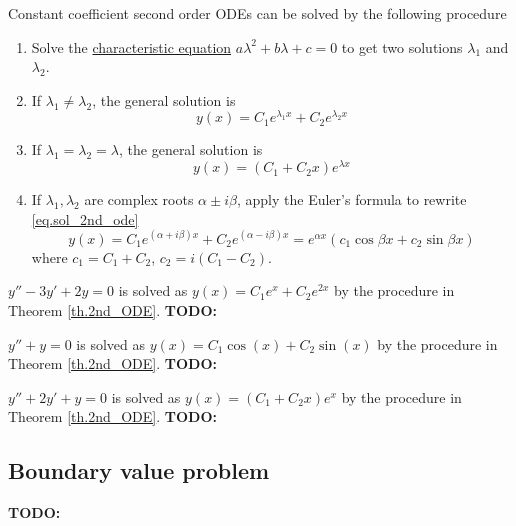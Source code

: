 \begin{theorem}[]\label{th.2nd_ODE}
    Constant coefficient second order ODEs can be solved by the following procedure
    \begin{enumerate}
        \item Solve the \underline{characteristic equation} $a\lambda^2 +  b\lambda + c = 0$ to get two solutions $\lambda_1$ and $\lambda_2$.
        \item If $\lambda_1\neq\lambda_2$, the general solution is 
        \begin{equation}\label{eq.sol_2nd_ode}
            y(x)=C_1 e^{\lambda_1 x}+C_2 e^{\lambda_2 x}
        \end{equation}
        \item If $\lambda_1=\lambda_2=\lambda$, the general solution is 
        \begin{equation}\label{eq.sol_2nd_ode_eqroot}
            y(x)=(C_1 + C_2x) e^{\lambda x}
        \end{equation}
        \item If $\lambda_1, \lambda_2$ are complex roots $\alpha \pm i\beta$, apply the Euler's formula to rewrite \eqref{eq.sol_2nd_ode}
        \begin{equation*}
            y(x)=C_1 e^{(\alpha+i \beta) x}+C_2 e^{(\alpha-i \beta) x}=e^{\alpha x}\left(c_1 \cos \beta x+c_2 \sin \beta x\right)
        \end{equation*}
        where $c_1=C_1+C_2$, $c_2=i(C_1-C_2)$.
    \end{enumerate}
\end{theorem}

\begin{example}[]
    $y'' - 3y' + 2y = 0$ is solved as $y(x)=C_1e^{x}+C_2e^{2x}$ by the procedure in Theorem \ref{th.2nd_ODE}.
    \textbf{TODO: }
\end{example}

\begin{example}[]
    $y'' + y = 0$ is solved as $y(x)=C_1\cos(x)+C_2\sin(x)$ by the procedure in Theorem \ref{th.2nd_ODE}.
    \textbf{TODO: }
\end{example}

\begin{example}[]
    $y'' + 2y' + y = 0$ is solved as $y(x)=(C_1+C_2x)e^x$ by the procedure in Theorem \ref{th.2nd_ODE}.
    \textbf{TODO: }
\end{example}

\subsection{Boundary value problem}
\textbf{TODO: }

